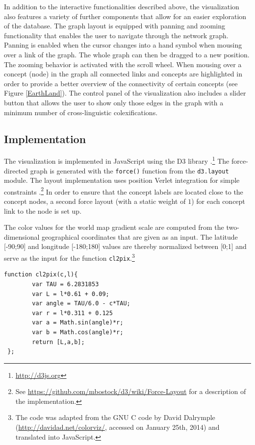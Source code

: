 
In addition to the interactive functionalities described above, the visualization also features a variety of further components that allow for an easier exploration of the database. The graph layout is equipped with panning and zooming functionality that enables the user to navigate through the network graph. Panning is enabled when the cursor changes into a hand symbol when mousing over a link of the graph. The whole graph can then be dragged to a new position. The zooming behavior is activated with the scroll wheel. 
When mousing over a concept (node) in the graph all connected links and concepts are highlighted
in order to provide a better overview of the connectivity of certain concepts (see Figure \ref{EarthLand}). The control panel of the visualization also includes a slider button that allows the user to show only those edges in the graph with a minimum number of cross-linguistic colexifications. 




\subsection{Implementation}

The visualization is implemented in JavaScript using the D3 library \cite{D3}.\footnote{\url{http://d3js.org}} The force-directed graph is  generated with the \texttt{force()} function from the \texttt{d3.layout} module. The layout implementation uses position Verlet integration for simple constraints \cite{Dwyer2009}.\footnote{See \url{https://github.com/mbostock/d3/wiki/Force-Layout} for a description of the implementation.} In order to ensure that the concept labels are located close to the concept nodes, a second force layout (with a static weight of $1$) for each concept link to the node is set up. 

The color values for the world map gradient scale are computed from the two-dimensional geographical coordinates that are given as an input. The latitude [-90;90] and longitude [-180;180] values are thereby normalized between [0;1] and serve as the input for the function \texttt{cl2pix}.\footnote{The code was adapted from the GNU C code by David Dalrymple (\url{http://davidad.net/colorviz/}, accessed on January 25th, 2014) and translated into JavaScript.}

\begin{verbatim}
function cl2pix(c,l){
   		var TAU = 6.2831853 
   		var L = l*0.61 + 0.09; 
   		var angle = TAU/6.0 - c*TAU;   
   		var r = l*0.311 + 0.125 
   		var a = Math.sin(angle)*r;
   		var b = Math.cos(angle)*r;
   		return [L,a,b];
 };
\end{verbatim}

